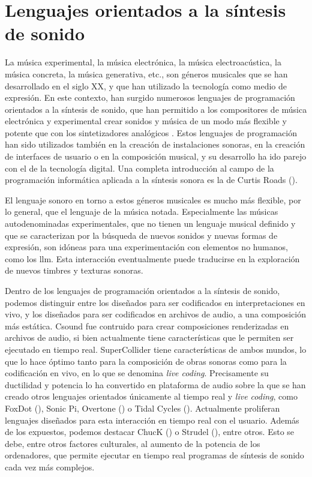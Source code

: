 \section{Lenguajes orientados a la síntesis de sonido}

La música experimental, la música electrónica, la música electroacústica, la música concreta, la música generativa, etc., son géneros musicales que se han desarrollado en el siglo XX, y que han utilizado la tecnología como medio de expresión. En este contexto, han surgido numerosos lenguajes de programación orientados a la síntesis de sonido, que han permitido a los compositores de música electrónica y experimental crear sonidos y música de un modo más flexible y potente que con los sintetizadores analógicos . Estos lenguajes de programación han sido utilizados también en la creación de instalaciones sonoras, en la creación de interfaces de usuario o en la composición musical, y su desarrollo ha ido parejo con el de la tecnología digital. Una completa introducción al campo de la programación informática aplicada a la síntesis sonora es la de Curtis Roads (\citeyear{roadsComputerMusicTutorial1996}).

El lenguaje sonoro en torno a estos géneros musicales es mucho más flexible, por lo general, que el lenguaje de la música notada. Especialmente las músicas autodenominadas experimentales, que no tienen un lenguaje musical definido y que se caracterizan por la búsqueda de nuevos sonidos y nuevas formas de expresión, son idóneas para una experimentación con elementos no humanos, como los \gls{llm}. Esta interacción eventualmente puede traducirse en la exploración de nuevos timbres y texturas sonoras.

Dentro de los lenguajes de programación orientados a la síntesis de sonido, podemos distinguir entre los diseñados para ser codificados en interpretaciones en vivo, y los diseñados para ser codificados en archivos de audio, a una composición más estática. {Csound} \citep{boulangerCsoundBookPerspectives2000} fue contruido para crear composiciones renderizadas en archivos de audio, si bien actualmente tiene características que le permiten ser ejecutado en tiempo real. {SuperCollider} \citep{wilsonSuperColliderBook2011a} tiene características de ambos mundos, lo que lo hace óptimo tanto para la composición de obras sonoras como para la codificación en vivo, en lo que se denomina \emph{live coding}. Precisamente su ductilidad y potencia lo ha convertido en plataforma de audio sobre la que se han creado otros lenguajes orientados únicamente al tiempo real y \emph{live coding}, como {FoxDot} (\citep{kirkbrideQirkyFoxDot2023}), {Sonic Pi}, {Overtone} (\citep{OvertoneCollaborativeProgrammable}) o {Tidal Cycles} (\citep{TidalCycles}). Actualmente proliferan lenguajes diseñados para esta interacción en tiempo real con el usuario. Además de los expuestos, podemos destacar {ChucK} (\citep{teamChucKStronglyTimedMusic}) o {Strudel} (\citep{StrudelREPL}), entre otros. Esto se debe, entre otros factores culturales, al aumento de la potencia de los ordenadores, que permite ejecutar en tiempo real programas de síntesis de sonido cada vez más complejos.

